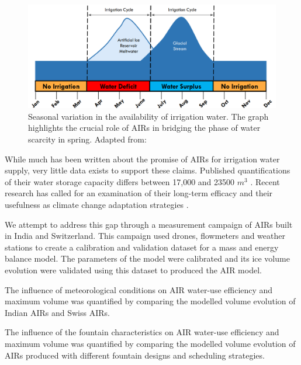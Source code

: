 \begin{figure}[t]
\centering
\includegraphics[width=12cm]{Figures/irrigation_cycles.png}

\caption{Seasonal variation in the availability of irrigation water. The graph highlights the crucial role of
AIRs in bridging the phase of water scarcity in spring. Adapted from: \cite{nusserLocalKnowledgeGlobal2016}}

\label{fig:irrigation_cycles}
\end{figure}

While much has been written about the promise of AIRs for irrigation water supply, very little data exists to
support these claims. Published quantifications of their water storage capacity differs between 17,000 and 23500
$m^3$ \citep{norphelSnowWaterHarvesting2015, baglaArtificialGlaciersHelp1998}. Recent research has called for an
examination of their long-term efficacy and their usefulness as climate change adaptation strategies
\citep{clouseLadakhArtificialGlaciers2017}. 

We attempt to address this gap through a measurement campaign of AIRs built in India and Switzerland. This
campaign used drones, flowmeters and weather stations to create a calibration and validation dataset for a mass
and energy balance model. The parameters of the model were calibrated and its ice volume evolution were
validated using this dataset to produced the AIR model. 

The influence of meteorological conditions on AIR water-use efficiency and maximum volume was quantified by
comparing the modelled volume evolution of Indian AIRs and Swiss AIRs.

The influence of the fountain characteristics on AIR water-use efficiency and maximum volume was quantified by
comparing the modelled volume evolution of AIRs produced with different fountain designs and scheduling
strategies.

